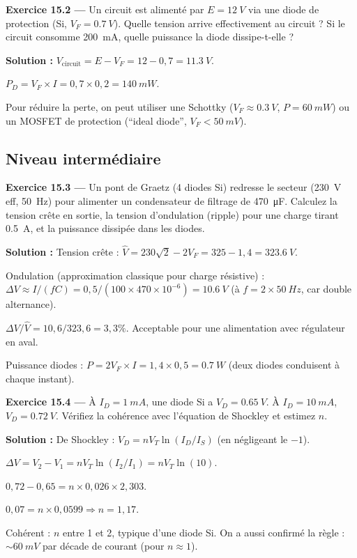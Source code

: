 \documentclass[12pt,a4paper,twoside]{book}
\begin{document}
\textbf{Exercice 15.2 ---} Un circuit est alimenté par $E = \SI{12}{V}$ via une diode de protection (Si, $V_F = \SI{0.7}{V}$). Quelle tension arrive effectivement au circuit ? Si le circuit consomme \SI{200}{mA}, quelle puissance la diode dissipe-t-elle ?

\begin{pratique}
\textbf{Solution :} $V_{\text{circuit}} = E - V_F = 12 - 0{,}7 = \SI{11.3}{V}$.

$P_D = V_F \times I = 0{,}7 \times 0{,}2 = \SI{140}{mW}$.

Pour réduire la perte, on peut utiliser une Schottky ($V_F \approx \SI{0.3}{V}$, $P = \SI{60}{mW}$) ou un MOSFET de protection (``ideal diode'', $V_F < \SI{50}{mV}$).
\end{pratique}

\subsection*{Niveau intermédiaire}

\textbf{Exercice 15.3 ---} Un pont de Graetz (4 diodes Si) redresse le secteur (\SI{230}{V} eff, \SI{50}{Hz}) pour alimenter un condensateur de filtrage de \SI{470}{\micro F}. Calculez la tension crête en sortie, la tension d'ondulation (ripple) pour une charge tirant \SI{0.5}{A}, et la puissance dissipée dans les diodes.

\begin{pratique}
\textbf{Solution :} Tension crête : $\hat{V} = 230\sqrt{2} - 2V_F = 325 - 1{,}4 = \SI{323.6}{V}$.

Ondulation (approximation classique pour charge résistive) : $\Delta V \approx I/(fC) = 0{,}5/(100\times470\times10^{-6}) = \SI{10.6}{V}$ (à $f = 2\times\SI{50}{Hz}$, car double alternance).

$\Delta V / \hat{V} = 10{,}6/323{,}6 = 3{,}3\%$. Acceptable pour une alimentation avec régulateur en aval.

Puissance diodes : $P = 2V_F \times I = 1{,}4 \times 0{,}5 = \SI{0.7}{W}$ (deux diodes conduisent à chaque instant).
\end{pratique}

\textbf{Exercice 15.4 ---} À $I_D = \SI{1}{mA}$, une diode Si a $V_D = \SI{0.65}{V}$. À $I_D = \SI{10}{mA}$, $V_D = \SI{0.72}{V}$. Vérifiez la cohérence avec l'équation de Shockley et estimez $n$.

\begin{pratique}
\textbf{Solution :} De Shockley : $V_D = nV_T \ln(I_D/I_S)$ (en négligeant le $-1$).

$\Delta V = V_2 - V_1 = nV_T \ln(I_2/I_1) = nV_T \ln(10)$.

$0{,}72 - 0{,}65 = n \times 0{,}026 \times 2{,}303$.

$0{,}07 = n \times 0{,}0599 \Rightarrow n = 1{,}17$.

Cohérent : $n$ entre 1 et 2, typique d'une diode Si. On a aussi confirmé la règle : $\sim\SI{60}{mV}$ par décade de courant (pour $n \approx 1$).
\end{pratique}
\end{document}
